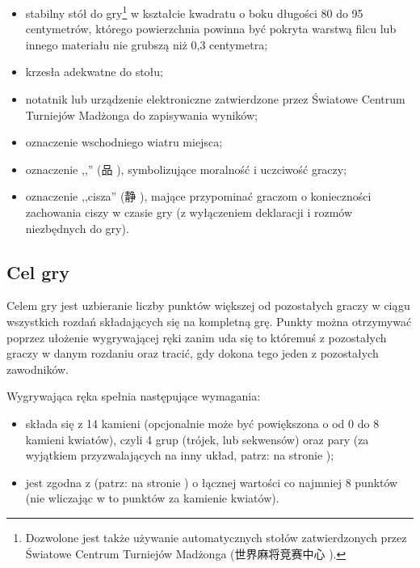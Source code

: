 \begin{itemize}
  oznaczona kropkami w liczbie od 1 do 6, przy czym ściany z 1 i 4 kropkami mają
  oznaczenia czerwone, podczas gdy pozostałe oznaczone są kropkami niebieskimi
  lub czarnymi;
  \item stabilny stół do gry\footnote{Dozwolone jest także używanie
  automatycznych stołów zatwierdzonych przez Światowe Centrum Turniejów
  Madżonga (世界麻将竞赛中心 ).} w kształcie
  kwadratu o boku długości 80 do 95 centymetrów, którego powierzchnia powinna
  być pokryta warstwą filcu lub innego materiału nie grubszą niż 0,3 centymetra;
  \item krzesła adekwatne do stołu;
  \item notatnik lub urządzenie elektroniczne zatwierdzone przez Światowe
  Centrum Turniejów Madżonga do zapisywania wyników;
  \item oznaczenie wschodniego wiatru miejsca;
  \item oznaczenie ,,'' (品 ), symbolizujące moralność i
  uczciwość graczy;
  \item oznaczenie ,,cisza'' (静 ), mające przypominać graczom o
  konieczności zachowania ciszy w czasie gry (z wyłączeniem deklaracji i rozmów
  niezbędnych do gry).
\end{itemize}

\subsection{Cel gry}
Celem gry jest uzbieranie liczby punktów większej od pozostałych graczy
w ciągu wszystkich rozdań składających się na kompletną grę. Punkty
można otrzymywać poprzez ułożenie wygrywającej ręki zanim uda się to któremuś z
pozostałych graczy w danym rozdaniu oraz tracić, gdy dokona tego jeden z
pozostałych zawodników.

\label{wygrywajacareka}
Wygrywająca ręka spełnia następujące wymagania:
\begin{itemize}
  \item składa się z 14 kamieni (opcjonalnie może być powiększona o od 0 do 8
  kamieni kwiatów), czyli 4 grup (trójek,  lub sekwensów) oraz
  pary (za wyjątkiem  przyzwalających na inny układ, patrz:
   na stronie \pageref{fan});
  \item jest zgodna z  (patrz:  na stronie
  \pageref{fan}) o łącznej wartości co najmniej 8 punktów (nie wliczając w to
  punktów za kamienie kwiatów).
\end{itemize}

